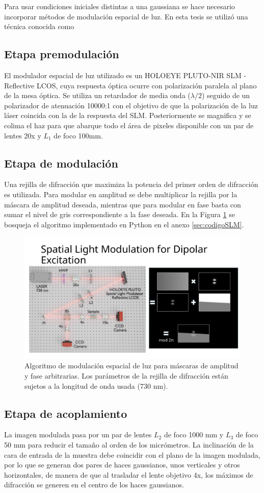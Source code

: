Para usar condiciones iniciales distintas a una gaussiana se hace necesario incorporar métodos de modulación espacial de luz. En esta tesis se utilizó una técnica conocida como 

\subsection{Etapa premodulación}
	El modulador espacial de luz utilizado es un HOLOEYE PLUTO-NIR SLM -  Reflective LCOS, cuya respuesta óptica ocurre con polarización paralela al plano de la mesa óptica. Se utiliza un retardador de media onda ($\lambda/2$) seguido de un polarizador de atenuación 10000:1 con el objetivo de que la polarización de la luz láser coincida con la de la respuesta del SLM. Posteriormente se magnifica y se colima el haz para que abarque todo el área de pixeles disponible con un par de lentes 20x y $L_1$ de foco 100mm. 
\subsection{Etapa de modulación}
	Una rejilla de difracción que maximiza la potencia del primer orden de difracción es utilizada. Para modular en amplitud se debe multiplicar la rejilla por la máscara de amplitud deseada, mientras que para modular en fase basta con sumar el nivel de gris correspondiente a la fase deseada. En la Figura \ref{fig:SLMblaze} se bosqueja el algoritmo implementado en Python en el anexo \ref{sec:codigoSLM}.
	
{
\begin{figure}
    \centering
    \includegraphics[width=0.35\linewidth, trim={19.5cm 0 0 5cm}, clip]{media/SLMblaze4.png}
    \caption[Modulación espacial de luz para máscaras de amplitud y fase arbitrarias.]{Algoritmo de modulación espacial de luz para máscaras de amplitud y fase arbitrarias. Los parámetros de la rejilla de difracción están sujetos a la longitud de onda usada (730 nm).\label{fig:SLMblaze}}
\end{figure}
}
\subsection{Etapa de acoplamiento}
La imagen modulada pasa por un par de lentes $L_2$ de foco 1000 mm y $L_3$ de foco 50 mm para reducir el tamaño al orden de los micrómetros. La inclinación de la cara de entrada de la muestra debe coincidir con el plano de la imagen modulada, por lo que se generan dos pares de haces gaussianos, unos verticales y otros horizontales, de manera de que al trasladar el lente objetivo 4x, los máximos de difracción se generen en el centro de los haces gaussianos. 
